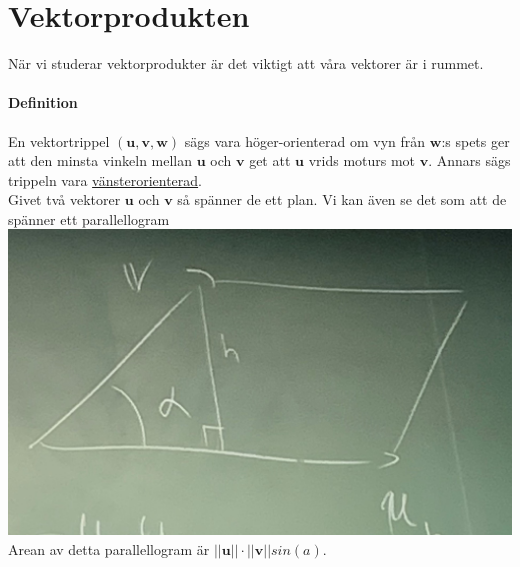 \section{Vektorprodukten}
    När vi studerar vektorprodukter är det viktigt att våra vektorer är i rummet.
    
    \paragraph{Definition} En vektortrippel $(\bm{u}, \bm{v}, \bm{w})$ sägs vara höger-orienterad om vyn från $\bm{w}$:s spets ger att den minsta vinkeln mellan $\bm{u}$ och $\bm{v}$ get att $\bm{u}$ vrids moturs mot $\bm{v}$.
    Annars sägs trippeln vara \underline{vänsterorienterad}.
    \\
    Givet två vektorer $\bm{u}$ och $\bm{v}$ så spänner de ett plan. Vi kan även se det som att de spänner ett parallellogram\\
    \includegraphics[scale=0.12]{imgs/22-01-20-img08.jpg}
    \\Arean av detta parallellogram är $||\bm{u}||\cdot||\bm{v}||sin(a)$.
    
